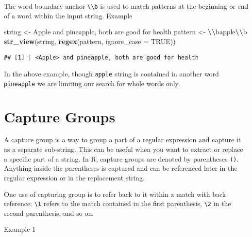 \documentclass[
]{book}
\newenvironment{Shaded}{\begin{snugshade}}{\end{snugshade}}
\newcommand{\AttributeTok}[1]{\textcolor[rgb]{0.13,0.29,0.53}{#1}}
\newcommand{\ConstantTok}[1]{\textcolor[rgb]{0.56,0.35,0.01}{#1}}
\newcommand{\FunctionTok}[1]{\textcolor[rgb]{0.13,0.29,0.53}{\textbf{#1}}}
\newcommand{\NormalTok}[1]{#1}
\newcommand{\OtherTok}[1]{\textcolor[rgb]{0.56,0.35,0.01}{#1}}
\newcommand{\SpecialCharTok}[1]{\textcolor[rgb]{0.81,0.36,0.00}{\textbf{#1}}}
\newcommand{\StringTok}[1]{\textcolor[rgb]{0.31,0.60,0.02}{#1}}
\begin{document}
The word boundary anchor \texttt{\textbackslash{}\textbackslash{}b} is used to match patterns at the beginning or end of a word within the input string. Example

\begin{Shaded}
\begin{Highlighting}[]
\NormalTok{string }\OtherTok{\textless{}{-}} \StringTok{\textquotesingle{}Apple and pineapple, both are good for health\textquotesingle{}}
\NormalTok{pattern }\OtherTok{\textless{}{-}} \StringTok{\textquotesingle{}}\SpecialCharTok{\textbackslash{}\textbackslash{}}\StringTok{bapple}\SpecialCharTok{\textbackslash{}\textbackslash{}}\StringTok{b\textquotesingle{}}
\FunctionTok{str\_view}\NormalTok{(string, }\FunctionTok{regex}\NormalTok{(pattern, }\AttributeTok{ignore\_case =} \ConstantTok{TRUE}\NormalTok{))}
\end{Highlighting}
\end{Shaded}

\begin{verbatim}
## [1] | <Apple> and pineapple, both are good for health
\end{verbatim}

In the above example, though \texttt{apple} string is contained in another word \texttt{pineapple} we are limiting our search for whole words only.

\hypertarget{capture-groups}{%
\section{Capture Groups}\label{capture-groups}}

A capture group is a way to group a part of a regular expression and capture it as a separate sub-string. This can be useful when you want to extract or replace a specific part of a string. In R, capture groups are denoted by parentheses \texttt{()}. Anything inside the parentheses is captured and can be referenced later in the regular expression or in the replacement string.

One use of capturing group is to refer back to it within a match with back reference: \texttt{\textbackslash{}1} refers to the match contained in the first parenthesis, \texttt{\textbackslash{}2} in the second parenthesis, and so on.

Example-1
\end{document}
